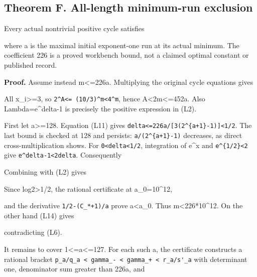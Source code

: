 \subsection{Theorem F. All-length minimum-run exclusion}

Every actual nontrivial positive cycle satisfies


where a is the maximal initial exponent-one run at its actual minimum.
The coefficient 226 is a proved workbench bound, not a claimed optimal
constant or published record.

\textbf{Proof.} Assume instead m\textless=226a. Multiplying the original
cycle equations gives


All x\_i\textgreater=3, so \nolinkurl{2^A<= (10/3)^m<4^m}, hence
A\textless2m\textless=452a. Also Lambda=e\^{}delta-1 is precisely the
positive expression in (L2).

First let a\textgreater=128. Equation (L11) gives
\texttt{delta\textless{}=226a/{[}3(2\^{}\{a+1\}-1){]}\textless{}1/2}.
The last bound is checked at 128 and persists:
\texttt{a/(2\^{}\{a+1\}-1)} decreases, as direct cross-multiplication
shows. For \nolinkurl{0<delta<1/2}, integration of e\^{}x and
\texttt{e\^{}\{1/2\}\textless{}2} give \nolinkurl{e^delta-1<2delta}.
Consequently


Combining with (L2) gives


Since log2\textgreater1/2, the rational certificate at a\_0=10\^{}12,


and the derivative \nolinkurl{1/2-(C_*+1)/a} prove a\textless a\_0. Thus
m\textless226*10\^{}12. On the other hand (L14) gives


contradicting (L6).

It remains to cover 1\textless=a\textless=127. For each such a, the
certificate constructs a rational bracket
\nolinkurl{p_a/q_a < gamma_- < gamma_+ < r_a/s'_a} with determinant one,
denominator sum greater than 226a, and

